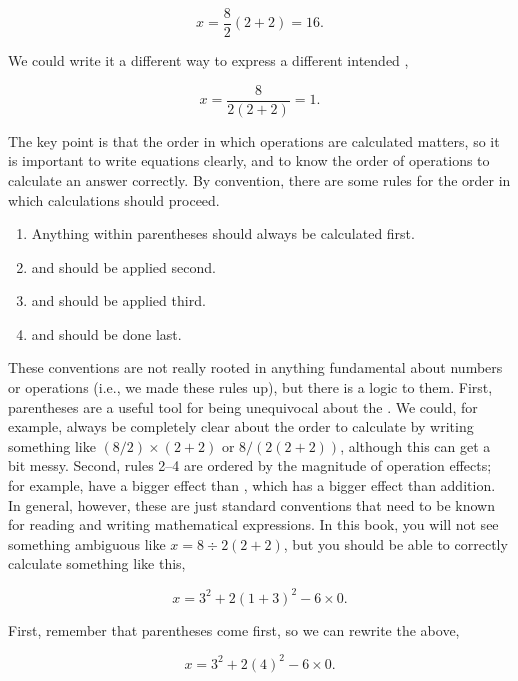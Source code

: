 \documentclass[
  openany]{krantz}
\providecommand{\tightlist}{%
  \setlength{\itemsep}{0pt}\setlength{\parskip}{0pt}}
\begin{document}
\[x = \frac{8}{2}\left(2 + 2\right) = 16.\]

We could write it a different way to express a different intended ,

\[x = \frac{8}{2(2+2)} = 1.\]

The key point is that the order in which operations are calculated matters, so it is important to write equations clearly, and to know the order of operations to calculate an answer correctly.
By convention, there are some rules for the order in which calculations should proceed.

\begin{enumerate}
\def\labelenumi{\arabic{enumi}.}
\tightlist
\item
  Anything within parentheses should always be calculated first.
\item
   and  should be applied second.
\item
   and  should be applied third.
\item
   and  should be done last.
\end{enumerate}

These conventions are not really rooted in anything fundamental about numbers or operations (i.e., we made these rules up), but there is a logic to them.
First, parentheses are a useful tool for being unequivocal about the .
We could, for example, always be completely clear about the order to calculate by writing something like \((8/2) \times (2+2)\) or \(8 / (2(2 + 2))\), although this can get a bit messy.
Second, rules 2--4 are ordered by the magnitude of operation effects; for example,  have a bigger effect than , which has a bigger effect than addition.
In general, however, these are just standard conventions that need to be known for reading and writing mathematical expressions.
In this book, you will not see something ambiguous like \(x = 8 \div 2\left(2+2\right)\), but you should be able to correctly calculate something like this,

\[x = 3^{2} + 2\left(1 + 3\right)^{2} - 6 \times 0.\]

First, remember that parentheses come first, so we can rewrite the above,

\[x = 3^{2} + 2\left(4\right)^{2} - 6 \times 0.\]
\end{document}
